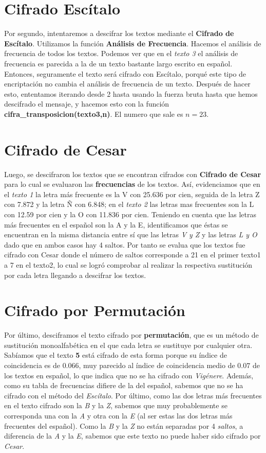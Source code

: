 \documentclass{article}
\begin{document}
\section{Cifrado Escítalo}
	Por segundo, intentaremos a descifrar los textos mediante el \textbf{Cifrado de Escítalo}. Utilizamos la función \textbf{Análisis de Frecuencia}.
	Hacemos el análisis de frecuencia de todos los textos. Podemos ver que en el \emph{texto 3} el análisis de frecuencia es parecida a la de un texto bastante largo escrito en español. Entonces, seguramente el texto será cifrado con Escítalo, porqué este tipo de encriptación no cambia el análisis de frecuencia de un texto.
	Después de hacer esto, ententamos iterando desde 2 hasta usando la fuerza bruta hasta que hemos descifrado el mensaje, y hacemos esto con la función \textbf{cifra\_transposicion(texto3,n)}. El numero que sale es $n=23$.
	
\section{Cifrado de Cesar}
	Luego, se descifraron los textos que se encontran cifrados con \textbf{Cifrado de Cesar} para lo cual se evaluaron las \textbf{frecuencias} de los textos. Así, evidenciamos que en el \emph{texto 1} la letra más frecuente es la V con 25.636 por cien, seguida de la letra Z con 7.872 y la letra Ñ con 6.848; en el \emph{texto 2} las letras mas frecuentes son la L con 12.59 por cien y la O con 11.836 por cien.
	Teniendo en cuenta que las letras más frecuentes en el español son la A y la E, identificamos que éstas se encuentran en la misma distancia entre sí que las letras \emph{V y Z} y las letras \emph{L y O} dado que en ambos casos hay 4 saltos. Por tanto se evalua que los textos fue cifrado con Cesar donde el número de saltos corresponde a 21 en el primer texto1 a 7 en el texto2, lo cual se logró comprobar al realizar la respectiva sustitución por cada letra llegando a descifrar los textos. 
	
\section{Cifrado por Permutación}
    Por último, desciframos el texto cifrado por \textbf{permutación}, que es un método de sustitución monoalfabética en el que cada letra se sustituye por cualquier otra. Sabíamos que el texto \textbf{5} está cifrado de esta forma porque su índice de coincidencia es de $0.066$, muy parecido al índice de coincidencia medio de $0.07$ de los textos en español, lo que indica que no se ha cifrado con \emph{Vigénere}. Además, como su tabla de frecuencias difiere de la del español, sabemos que no se ha cifrado con el método del \emph{Escítalo}. Por último, como las dos letras más frecuentes en el texto cifrado son la \emph{B} y la \emph{Z}, sabemos que muy probablemente se corresponda una con la \emph{A} y otra con la \emph{E} (al ser estas las dos letras más frecuentes del español). Como la \emph{B} y la \emph{Z} no están separadas por 4 \emph{saltos}, a diferencia de la \emph{A} y la \emph{E}, sabemos que este texto no puede haber sido cifrado por \emph{Cesar}.
    
\end{document}
